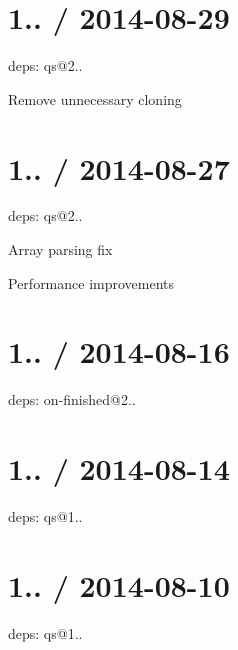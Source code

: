 \section*{1.. / 2014-\/08-\/29 }


\begin{DoxyItemize}
\item deps\+: qs@2..
\begin{DoxyItemize}
\item Remove unnecessary cloning
\end{DoxyItemize}
\end{DoxyItemize}

\section*{1.. / 2014-\/08-\/27 }


\begin{DoxyItemize}
\item deps\+: qs@2..
\begin{DoxyItemize}
\item Array parsing fix
\item Performance improvements
\end{DoxyItemize}
\end{DoxyItemize}

\section*{1.. / 2014-\/08-\/16 }


\begin{DoxyItemize}
\item deps\+: on-\/finished@2..
\end{DoxyItemize}

\section*{1.. / 2014-\/08-\/14 }


\begin{DoxyItemize}
\item deps\+: qs@1..
\end{DoxyItemize}

\section*{1.. / 2014-\/08-\/10 }


\begin{DoxyItemize}
\item deps\+: qs@1..
\end{DoxyItemize}

